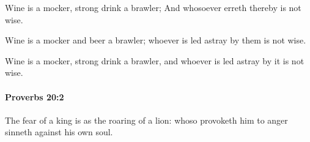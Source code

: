 			\begin{versebox}
					\item[BHS] 
					\item[ASV] Wine is a mocker, strong drink a brawler; And whosoever erreth thereby is not wise.
					\item[NIV] Wine is a mocker and beer a brawler; whoever is led astray by them is not wise.
					\item[NRSV] Wine is a mocker, strong drink a brawler, and whoever is led astray by it is not wise.
			\end{versebox}

		\paragraph{Proverbs 20:2} %
			\label{PROVERBS-20-2}

			The fear of a king is as the roaring of a lion: whoso provoketh him to anger sinneth against his own soul.

